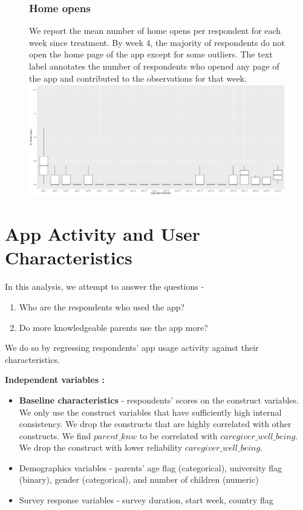 \documentclass{article}
\begin{document}
\begin{figure}
\subsubsection*{Home opens}
We report the mean number of home opens per respondent for each week since treatment. By week 4, the majority of respondents do not open the home page of the app except for some outliers. The text label annotates the number of respondents who opened any page of the app and contributed to the observations for that week.
\includegraphics[scale=0.35]{plots/app usage over time - home opens.png}
\end{figure}

\section*{App Activity and User Characteristics}

In this analysis, we attempt to answer the questions - 
\begin{enumerate}
    \item Who are the respondents who used the app?
    \item Do more knowledgeable parents use the app more? 
\end{enumerate}

We do so by regressing respondents' app usage activity against their characteristics.
\vspace{1em}

\textbf{Independent variables :}
\begin{itemize}
    \item \textbf{Baseline characteristics} - respondents' scores on the construct variables. We only use the construct variables that have sufficiently high internal consistency. We drop the constructs that are highly correlated with other constructs. We find $parent\_knw$ to be correlated with $caregiver\_well\_being$. We drop the construct with lower reliability $caregiver\_well\_being$. 
    \item Demographics variables - parents' age flag (categorical), university flag (binary), gender (categorical), and number of children (numeric)
    \item Survey response variables - survey duration, start week, country flag
\end{itemize}
\end{document}
